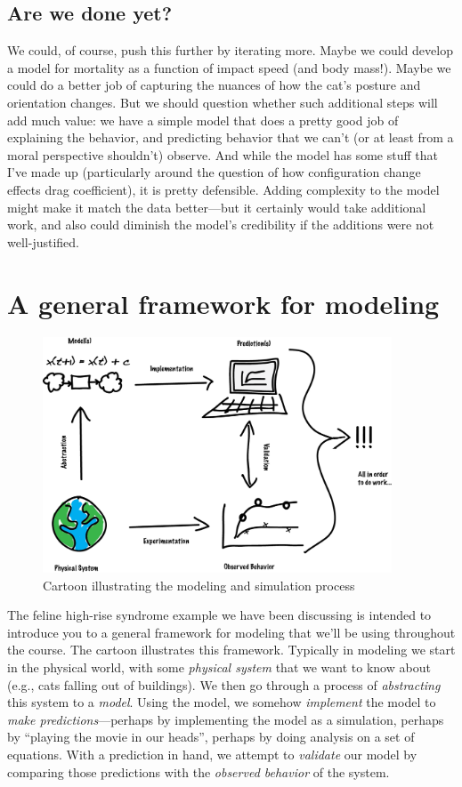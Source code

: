 \subsection{Are we done yet?}

We could, of course, push this further by iterating more.  Maybe we
could develop a model for mortality as a function of impact speed (and
body mass!).  Maybe we could do a better job of capturing the nuances
of how the cat's posture and orientation changes.  But we should
question whether such additional steps will add much value: we have a
simple model that does a pretty good job of explaining the behavior,
and predicting behavior that we can't (or at least from a moral
perspective shouldn't) observe.  And while the model has some stuff
that I've made up (particularly around the question of how
configuration change effects drag coefficient), it is pretty
defensible.  Adding complexity to the model might make it match the
data better---but it certainly would take additional work, and also
could diminish the model's credibility if the additions were not
well-justified.

\section{A general framework for modeling}

\begin{figure}

\centerline{\includegraphics[height=7cm]{figs/LabeledModsimDiagram}}

\caption{Cartoon illustrating the modeling and simulation process}
\end{figure}

The feline high-rise syndrome example we have been discussing is
intended to introduce you to a general framework for modeling that
we'll be using throughout the course.  The cartoon illustrates this
framework. Typically in modeling we start in the physical world, with
some {\it physical system} that we want to know about (e.g., cats
falling out of buildings).  We then go through a process of {\it
  abstracting} this system to a {\it model}.  Using the model, we
somehow {\it implement} the model to {\it make predictions}---perhaps
by implementing the model as a simulation, perhaps by ``playing the
movie in our heads'', perhaps by doing analysis on a set of equations.
With a prediction in hand, we attempt to {\it validate} our model by
comparing those predictions with the {\it observed behavior} of the
system.

